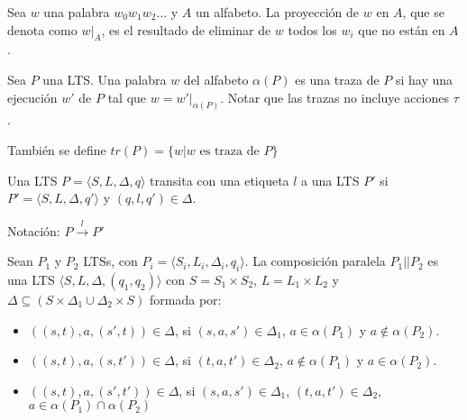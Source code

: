 \begin{definicion}[Proyecci\'on]
 Sea $w$ una palabra $w_0w_1w_2\dots$ y $A$ un alfabeto. La proyecci\'on de $w$ en $A$, que se denota como $w\lvert_A$, es el resultado de eliminar de $w$ todos los $w_i$ que no est\'an en $A$. 
\end{definicion}

\begin{definicion}[Trazas]
 Sea $P$ una LTS. Una palabra $w$ del alfabeto $\alpha(P)$ es una traza de $P$ si hay una ejecuci\'on $w'$ de $P$ tal que $w=w'\lvert_{\alpha(P)}$. Notar que las trazas no incluye acciones $\tau$. 
 
 Tambi\'en se define $tr(P) = \{w | w \text{ es traza de } P \}$
\end{definicion}

\begin{definicion}[Transitar]
 Una LTS $P=\langle S,L,\Delta,q\rangle$ transita con una etiqueta $l$ a una LTS $P'$ si $P'=\langle S,L,\Delta,q'\rangle$ y $(q,l,q') \in \Delta$.
 
 Notaci\'on: $P \overset{l}{\longrightarrow} P'$
\end{definicion}

\begin{definicion}
 Sean $P_1$ y $P_2$ LTSs, con $P_i = \langle S_i, L_i, \Delta_i, q_i\rangle$. La composici\'on paralela $P_1||P_2$ es una LTS $\langle S, L,\Delta, (q_1,q_2) \rangle$ con $S = S_1 \times S_2$, $L = L_1 \times L_2$ y $\Delta \subseteq (S \times \Delta_1 \cup \Delta_2 \times S)$ formada por:
 
 \begin{itemize}
  \item $((s,t),a,(s',t)) \in \Delta$, si $(s,a,s')\in\Delta_1$, $a\in\alpha(P_1)$ y $a\notin\alpha(P_2)$.
  
  \item $((s,t),a,(s,t')) \in \Delta$, si $(t,a,t')\in\Delta_2$, $a\notin\alpha(P_1)$ y $a\in\alpha(P_2)$.
  
  \item $((s,t),a,(s',t')) \in \Delta$, si $(s,a,s')\in\Delta_1$, $(t,a,t')\in\Delta_2$, $a\in\alpha(P_1)\cap\alpha(P_2)$
 \end{itemize}

 

\end{definicion}
